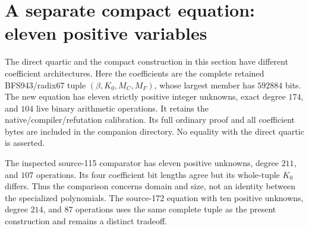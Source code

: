 \section{A separate compact equation: eleven positive variables}
\label{sec:constant-dilation}
The direct quartic and the compact construction in this section have different
coefficient architectures. Here the coefficients are the complete retained
BFS943/radix67 tuple $(\beta,K_0,M_C,M_F)$, whose largest member has
$592884$ bits. The new equation has eleven strictly positive integer
unknowns, exact degree $174$, and $104$ live binary arithmetic operations.
It retains the native/compiler/refutation calibration. Its full ordinary
proof and all coefficient bytes are included in the companion directory.
No equality with the direct quartic is asserted.

The inspected source-115 comparator has eleven positive unknowns, degree
$211$, and $107$ operations. Its four coefficient bit lengths agree but its
whole-tuple $K_0$ differs. Thus the comparison concerns domain and size,
not an identity between the specialized polynomials. The source-172 equation
with ten positive unknowns, degree $214$, and $87$ operations uses the same
complete tuple as the present construction and remains a distinct tradeoff.

